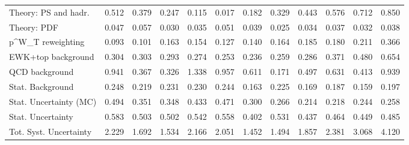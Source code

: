 \begin{tabular}{l|p{0.6cm}p{0.6cm}p{0.6cm}p{0.6cm}p{0.6cm}p{0.6cm}p{0.6cm}p{0.6cm}p{0.6cm}p{0.6cm}p{0.6cm}}
Theory: PS and hadr.                     & 0.512 & 0.379 & 0.247 & 0.115 & 0.017 & 0.182 & 0.329 & 0.443 & 0.576 & 0.712 & 0.850 \\
Theory: PDF                              & 0.047 & 0.057 & 0.030 & 0.035 & 0.051 & 0.039 & 0.025 & 0.034 & 0.037 & 0.032 & 0.038 \\
p^{W}_{T} reweighting                    & 0.093 & 0.101 & 0.163 & 0.154 & 0.127 & 0.140 & 0.164 & 0.185 & 0.180 & 0.211 & 0.366 \\
EWK+top background                       & 0.304 & 0.303 & 0.293 & 0.274 & 0.253 & 0.236 & 0.259 & 0.286 & 0.371 & 0.480 & 0.654 \\
QCD background                           & 0.941 & 0.367 & 0.326 & 1.338 & 0.957 & 0.611 & 0.171 & 0.497 & 0.631 & 0.413 & 0.939 \\
Stat. Background                         & 0.248 & 0.219 & 0.231 & 0.230 & 0.244 & 0.163 & 0.225 & 0.169 & 0.187 & 0.159 & 0.197 \\
Stat. Uncertainty (MC)                   & 0.494 & 0.351 & 0.348 & 0.433 & 0.471 & 0.300 & 0.266 & 0.214 & 0.218 & 0.244 & 0.258 \\
\hline
Stat. Uncertainty                        & 0.583 & 0.503 & 0.502 & 0.542 & 0.558 & 0.402 & 0.531 & 0.437 & 0.464 & 0.449 & 0.485 \\
\hline
Tot. Syst. Uncertainty                   & 2.229 & 1.692 & 1.534 & 2.166 & 2.051 & 1.452 & 1.494 & 1.857 & 2.381 & 3.068 & 4.120 \\
\hline
\end{tabular}
